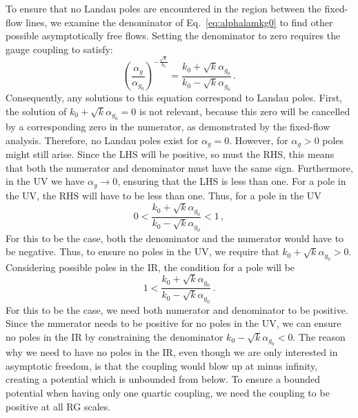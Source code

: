 To ensure that no Landau poles are encountered in the region between the fixed-flow lines, we examine the denominator of Eq.~\eqref{eq:alphalamkg0} to find other possible asymptotically free flows. Setting the denominator to zero requires the gauge coupling to satisfy:
\begin{equation}
    \left(\frac{\alpha_g}{\alpha_{g_0}}\right)^{-\frac{\sqrt{k}}{b_0}}=\frac{k_0+\sqrt{k}\alpha_{g_0}}{k_0-\sqrt{k}\alpha_{g_0}}\,.
\end{equation}
Consequently, any solutions to this equation correspond to Landau poles. First, the solution of $k_0+\sqrt{k}\alpha_{g_0}=0$ is not relevant, because this zero will be cancelled by a corresponding zero in the numerator, as demonstrated by the fixed-flow analysis. Therefore, no Landau poles exist for $\alpha_g=0$. However, for $\alpha_g>0$ poles might still arise. Since the LHS will be positive, so must the RHS, this means that both the numerator and denominator must have the same sign. Furthermore, in the UV we have $\alpha_g\to0$, ensuring that the LHS is less than one. For a pole in the UV, the RHS will have to be less than one. Thus, for a pole in the UV
\begin{equation}
    0<\frac{k_0+\sqrt{k}\alpha_{g_0}}{k_0-\sqrt{k}\alpha_{g_0}}<1\,,
\end{equation}
For this to be the case, both the denominator and the numerator would have to be negative. Thus, to ensure no poles in the UV, we require that $k_0+\sqrt{k}\alpha_{g_0}>0$. Considering possible poles in the IR, the condition for a pole will be
\begin{equation}
    1<\frac{k_0+\sqrt{k}\alpha_{g_0}}{k_0-\sqrt{k}\alpha_{g_0}}\,.
\end{equation}
For this to be the case, we need both numerator and denominator to be positive. Since the numerator needs to be positive for no poles in the UV, we can ensure no poles in the IR by constraining the denominator $k_0-\sqrt{k}\alpha_{g_0}<0$. The reason why we need to have no poles in the IR, even though we are only interested in asymptotic freedom, is that the coupling would blow up at minus infinity, creating a potential which is unbounded from below. To ensure a bounded potential when having only one quartic coupling, we need the coupling to be positive at all RG scales. 

